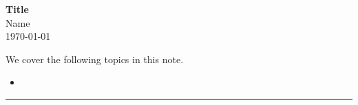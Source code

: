 \documentclass[11pt,openany]{article}
\theoremstyle{definitionstyle}
\begin{document}
\begin{center}
	\huge\textbf{Title}\\
	\vspace{0.5em}
	\large{Name}\\
	\vspace{0.5em}
	\normalsize{\today}\\
\end{center}
\noindent We cover the following topics in this note.
\begin{itemize}
	\item 
\end{itemize}
\hrule\vspace{12pt}
\end{document}
